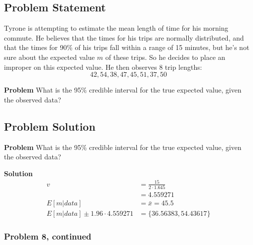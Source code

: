 \documentclass[12pt]{article}
\theoremstyle{definition}
\begin{document}
\subsection*{Problem Statement}

Tyrone is attempting to estimate the mean length of time for his morning commute. He believes that the times for his trips are normally distributed, and that the times for 90\% of his trips fall within a range of 15 minutes, but he's not sure about the expected value $m$ of these trips. So he decides to place an improper on this expected value. He then observes 8 trip lengths:
$$
42, 54, 38, 47, 45, 51, 37, 50
$$

\noindent
{\bf Problem} What is the 95\% credible interval for the true expected value, given the observed data?


\subsection*{Problem Solution}

\noindent
{\bf Problem} What is the 95\% credible interval for the true expected value, given the observed data?

\bigskip
\noindent
{\bf Solution} 
\begin{align*}
v &= \frac{15}{2 \cdot 1.645}\\
&= 4.559271\\
E[m|data] &= \bar{x} = 45.5\\
E[m|data] \pm 1.96 \cdot 4.559271 &= \{36.56383, 54.43617\}
\end{align*}

\newpage
\subsubsection*{Problem 8, continued}
\end{document}
